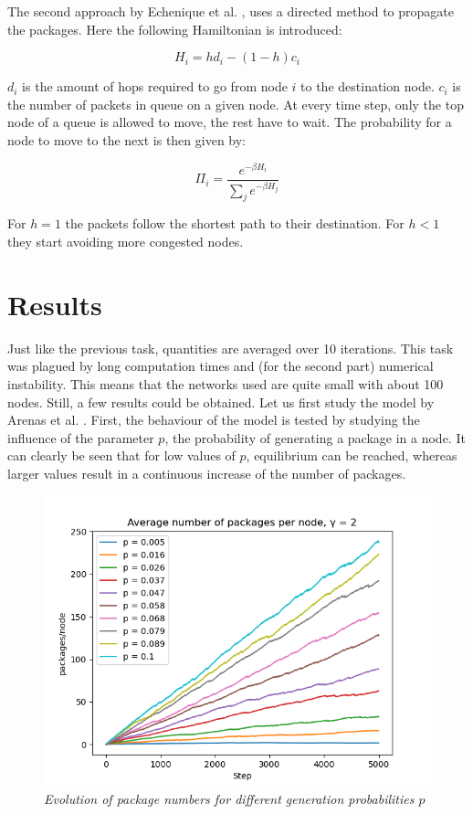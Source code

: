 The second approach by Echenique et al. \cite{optimal_routing}, \cite{optimal_routing2} uses a directed method to propagate the packages. Here the following Hamiltonian is introduced:

\begin{equation}
    H_i = hd_i - (1-h)c_i
\end{equation}

\noindent $d_i$ is the amount of hops required to go from node $i$ to the destination node. $c_i$ is the number of packets in queue on a given node. At every time step, only the top node of a queue is allowed to move, the rest have to wait. The probability for a node to move to the next is then given by:

\begin{equation}
    \Pi_i = \frac{e^{-\beta H_i}}{\sum_j e^{-\beta H_j}}
\end{equation}

For $h=1$ the packets follow the shortest path to their destination. For $h<1$ they start avoiding more congested nodes.

\section{Results}

Just like the previous task, quantities are averaged over 10 iterations. This task was plagued by long computation times and (for the second part) numerical instability. This means that the networks used are quite small with about 100 nodes. Still, a few results could be obtained. Let us first study the model by Arenas et al. \cite{hierarchical_traffic}. First, the behaviour of the model is tested by studying the influence of the parameter $p$, the probability of generating a package in a node. It can clearly be seen that for low values of $p$, equilibrium can be reached, whereas larger values result in a continuous increase of the number of packages.

\begin{figure}[H]
    \centering
    \includegraphics[width=0.75\linewidth]{images/gam_3_smallRange.png}
    \caption{\textit{Evolution of package numbers for different generation probabilities $p$}}
    \label{p_influence}
\end{figure}


